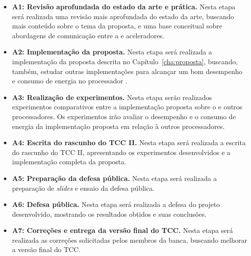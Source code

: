 \begin{itemize}
    \item \textbf{A1: Revisão aprofundada do estado da arte e prática.} Nesta etapa será
        realizada uma revisão mais aprofundada do estado da arte, buscando mais
        conteúdo sobre o tema da proposta, e uma base conceitual sobre abordagens de
        comunicação entre a \cpu e aceleradores.
    \item \textbf{A2: Implementação da proposta.} Nesta etapa será realizada a
        implementação da proposta descrita no Capítulo~\ref{cha:proposta},
        buscando, também, estudar outras implementações para alcançar um bom
        desempenho e consumo de energia no processador \mppa.
    \item \textbf{A3: Realização de experimentos.} Nesta etapa serão realizados
        experimentos comparativos entre a implementação proposta sobre o \mppa e
        outros processadores. Os experimentos irão avaliar o desempenho e o consumo de
        energia da implementação proposta em relação à outros processadores.
    \item \textbf{A4: Escrita do rascunho do TCC II.} Nesta etapa será realizada
        a escrita do rascunho do TCC II, apresentando os experimentos desenvolvidos e a
        implementação completa da proposta.
    \item \textbf{A5: Preparação da defesa pública.} Nesta etapa será realizada
        a preparação de \textit{slides} e ensaio da defesa pública.
    \item \textbf{A6: Defesa pública.} Nesta etapa será realizada a defesa do
        projeto desenvolvido, mostrando os resultados obtidos e suas conclusões.
    \item \textbf{A7: Correções e entrega da versão final do TCC.} Nesta etapa
        será realizada as correções solicitadas pelos membros da banca, buscando
        melhorar a versão final do TCC.
\end{itemize}

